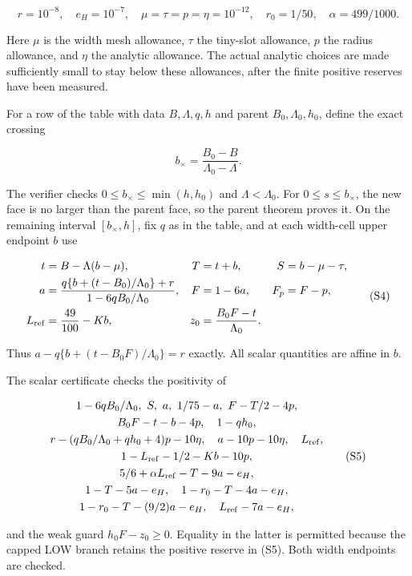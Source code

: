 \[
 r=10^{-8},\quad e_H=10^{-7},\quad
 \mu=\tau=p=\eta=10^{-12},\quad r_0=1/50,\quad
 \alpha=499/1000.
\tag{S2}
\]

Here \(\mu\) is the width mesh allowance, \(\tau\) the tiny-slot allowance, \(p\) the radius allowance, and \(\eta\) the analytic allowance. The actual analytic choices are made sufficiently small to stay below these allowances, after the finite positive reserves have been measured.

For a row of the table with data \(B,\Lambda,q,h\) and parent \(B_0,\Lambda_0,h_0\), define the exact crossing

\[
 b_\times=\frac{B_0-B}{\Lambda_0-\Lambda}.
\tag{S3}
\]

The verifier checks \(0\le b_\times\le\min(h,h_0)\) and \(\Lambda<\Lambda_0\). For \(0\le s\le b_\times\), the new face is no larger than the parent face, so the parent theorem proves it. On the remaining interval \([b_\times,h]\), fix \(q\) as in the table, and at each width-cell upper endpoint \(b\) use

\[
\begin{aligned}
t&=B-\Lambda(b-\mu),& T&=t+b,& S&=b-\mu-\tau,\\
a&=\frac{q\{b+(t-B_0)/\Lambda_0\}+r}
        {1-6qB_0/\Lambda_0},&
F&=1-6a,& F_p&=F-p,\\
L_{\rm ref}&=\frac{49}{100}-Kb,&
z_0&=\frac{B_0F-t}{\Lambda_0}.
\end{aligned}
\tag{S4}
\]

Thus \(a-q\{b+(t-B_0F)/\Lambda_0\}=r\) exactly. All scalar quantities are affine in \(b\).

The scalar certificate checks the positivity of

\[
\begin{gathered}
1-6qB_0/\Lambda_0,\ S,\ a,\ 1/75-a,\ F-T/2-4p,\\
B_0F-t-b-4p,\quad 1-qh_0,\\
r-(qB_0/\Lambda_0+qh_0+4)p-10\eta,\quad
a-10p-10\eta,\quad L_{\rm ref},\\
1-L_{\rm ref}-1/2-Kb-10p,\\
5/6+\alpha L_{\rm ref}-T-9a-e_H,\\
1-T-5a-e_H,\quad 1-r_0-T-4a-e_H,\\
1-r_0-T-(9/2)a-e_H,\quad L_{\rm ref}-7a-e_H,
\end{gathered}
\tag{S5}
\]

and the weak guard \(h_0F-z_0\ge0\). Equality in the latter is permitted because the capped LOW branch retains the positive reserve in (S5). Both width endpoints are checked.

